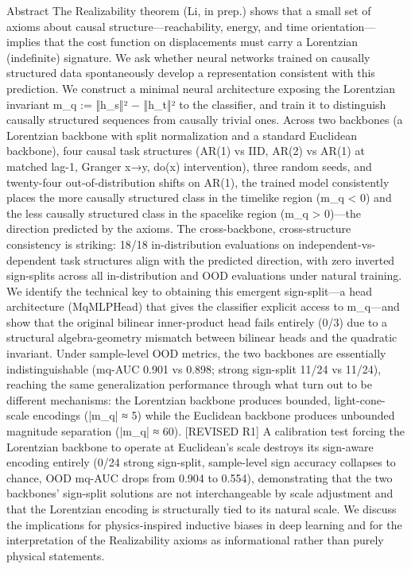 Abstract
The Realizability theorem (Li, in prep.) shows that a small set of axioms about causal structure—reachability, energy, and time orientation—implies that the cost function on displacements must carry a Lorentzian (indefinite) signature. We ask whether neural networks trained on causally structured data spontaneously develop a representation consistent with this prediction. We construct a minimal neural architecture exposing the Lorentzian invariant m_q := ‖h_s‖² − ‖h_t‖² to the classifier, and train it to distinguish causally structured sequences from causally trivial ones. Across two backbones (a Lorentzian backbone with split normalization and a standard Euclidean backbone), four causal task structures (AR(1) vs IID, AR(2) vs AR(1) at matched lag-1, Granger x→y, do(x) intervention), three random seeds, and twenty-four out-of-distribution shifts on AR(1), the trained model consistently places the more causally structured class in the timelike region (m_q < 0) and the less causally structured class in the spacelike region (m_q > 0)—the direction predicted by the axioms. The cross-backbone, cross-structure consistency is striking: 18/18 in-distribution evaluations on independent-vs-dependent task structures align with the predicted direction, with zero inverted sign-splits across all in-distribution and OOD evaluations under natural training. We identify the technical key to obtaining this emergent sign-split—a head architecture (MqMLPHead) that gives the classifier explicit access to m_q—and show that the original bilinear inner-product head fails entirely (0/3) due to a structural algebra-geometry mismatch between bilinear heads and the quadratic invariant. Under sample-level OOD metrics, the two backbones are essentially indistinguishable (mq-AUC 0.901 vs 0.898; strong sign-split 11/24 vs 11/24), reaching the same generalization performance through what turn out to be different mechanisms: the Lorentzian backbone produces bounded, light-cone-scale encodings (|m_q| ≈ 5) while the Euclidean backbone produces unbounded magnitude separation (|m_q| ≈ 60). [REVISED R1] A calibration test forcing the Lorentzian backbone to operate at Euclidean's scale destroys its sign-aware encoding entirely (0/24 strong sign-split, sample-level sign accuracy collapses to chance, OOD mq-AUC drops from 0.904 to 0.554), demonstrating that the two backbones' sign-split solutions are not interchangeable by scale adjustment and that the Lorentzian encoding is structurally tied to its natural scale. We discuss the implications for physics-inspired inductive biases in deep learning and for the interpretation of the Realizability axioms as informational rather than purely physical statements.

